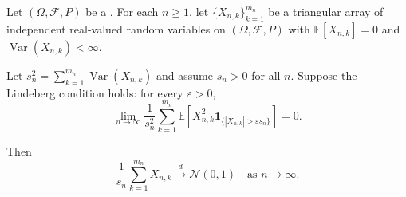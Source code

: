 \begin{theorem} \label{theorem:lindeberg_feller_central_limit_theorem}
Let $(\Omega, \mathcal{F}, P)$ be a . For each $n \geq 1$, let $\{X_{n,k}\}_{k=1}^{m_n}$ be a triangular array of independent real-valued random variables on $(\Omega, \mathcal{F}, P)$ with $\mathbb{E}[X_{n,k}] = 0$ and $\operatorname{Var}(X_{n,k}) < \infty$.

Let $s_n^2 = \sum_{k=1}^{m_n} \operatorname{Var}(X_{n,k})$ and assume $s_n > 0$ for all $n$. Suppose the Lindeberg condition holds: for every $\varepsilon > 0$,
$$\lim_{n \to \infty} \frac{1}{s_n^2} \sum_{k=1}^{m_n} \mathbb{E}\left[X_{n,k}^2 \mathbf{1}_{\{|X_{n,k}| > \varepsilon s_n\}}\right] = 0.$$

Then
$$\frac{1}{s_n} \sum_{k=1}^{m_n} X_{n,k} \xrightarrow{d} \mathcal{N}(0, 1) \quad \text{as } n \to \infty.$$
\end{theorem}